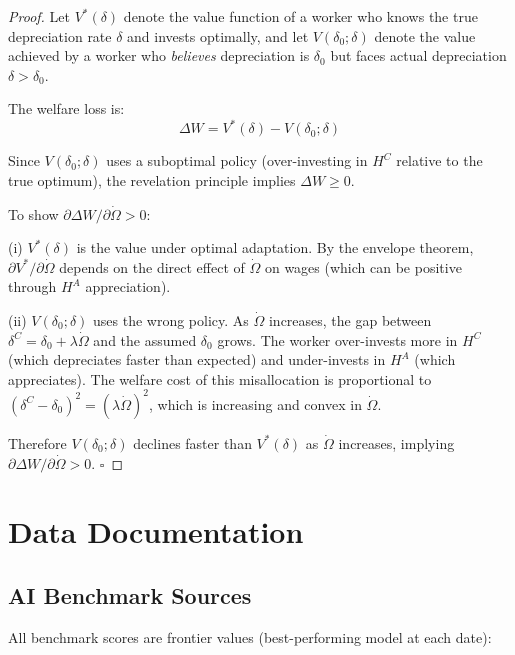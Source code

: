 \documentclass[11pt,a4paper]{article}
\theoremstyle{definition}
\begin{document}
\begin{proof}
Let $V^*(\delta)$ denote the value function of a worker who knows the true depreciation rate $\delta$ and invests optimally, and let $V(\delta_0; \delta)$ denote the value achieved by a worker who \textit{believes} depreciation is $\delta_0$ but faces actual depreciation $\delta > \delta_0$.

The welfare loss is:
\begin{equation}
\Delta W = V^*(\delta) - V(\delta_0; \delta)
\end{equation}

Since $V(\delta_0; \delta)$ uses a suboptimal policy (over-investing in $H^C$ relative to the true optimum), the revelation principle implies $\Delta W \geq 0$.

To show $\partial \Delta W / \partial \dot{\Omega} > 0$:

(i) $V^*(\delta)$ is the value under optimal adaptation. By the envelope theorem, $\partial V^* / \partial \dot{\Omega}$ depends on the direct effect of $\dot{\Omega}$ on wages (which can be positive through $H^A$ appreciation).

(ii) $V(\delta_0; \delta)$ uses the wrong policy. As $\dot{\Omega}$ increases, the gap between $\delta^C = \delta_0 + \lambda \dot{\Omega}$ and the assumed $\delta_0$ grows. The worker over-invests more in $H^C$ (which depreciates faster than expected) and under-invests in $H^A$ (which appreciates). The welfare cost of this misallocation is proportional to $(\delta^C - \delta_0)^2 = (\lambda \dot{\Omega})^2$, which is increasing and convex in $\dot{\Omega}$.

Therefore $V(\delta_0; \delta)$ declines faster than $V^*(\delta)$ as $\dot{\Omega}$ increases, implying $\partial \Delta W / \partial \dot{\Omega} > 0$. $\square$
\end{proof}


\section{Data Documentation}
\label{app:data}

\subsection{AI Benchmark Sources}

All benchmark scores are frontier values (best-performing model at each date):
\end{document}
